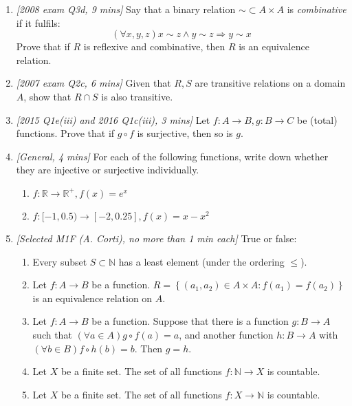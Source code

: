 \documentclass[10pt,a4paper]{article}
\begin{document}
\begin{enumerate}
    \item \emph{[2008 exam Q3d, 9 mins]}
    Say that a binary relation \(\sim \subset A \times A \)  is \emph{combinative} if it fulfils:
    \[ (\forall x, y, z) x \sim z \land y \sim z \Rightarrow y \sim x \]
    Prove that if \(R\) is reflexive and combinative, then \(R\) is an equivalence relation.

    \item \emph{[2007 exam Q2c, 6 mins]}
    Given that \(R, S\) are transitive relations on a domain \(A\), show that \( R \cap S \) is also transitive.

    \item \emph{[2015 Q1e(iii) and 2016 Q1c(iii), 3 mins]}
    Let \(f: A \rightarrow B, g : B \rightarrow C\) be (total) functions.
    Prove that if \(g \circ f\) is surjective, then so is \(g\).

    \item \emph{[General, 4 mins]}
    For each of the following functions, write down whether they are injective or surjective individually.
    \begin{enumerate}
        \item \( f : \mathbb{R} \rightarrow \mathbb{R}^+, f(x) = e^x \)
        \item \( f : [-1, 0.5) \rightarrow [-2, 0.25], f(x) = x - x^2 \)
    \end{enumerate}

    \item \emph{[Selected M1F (A. Corti), no more than 1 min each]}
    True or false:
    \begin{enumerate}
        \item Every subset \(S \subset \mathbb{N} \) has a least element (under the ordering \( \le \)).
        \item Let \(f : A \rightarrow B \) be a function.
        \( R = \left\{ (a_1, a_2) \in A \times A : f(a_1) = f(a_2) \right\} \) 
        is an equivalence relation on \(A\).
        \item Let \( f : A \rightarrow B \) be a function.
        Suppose that there is a function \( g : B \rightarrow A \) such that 
        \( (\forall a \in A) g \circ f (a) = a \), and another function \( h : B \rightarrow A \) with 
        \( (\forall b \in B) f \circ h (b) = b \). Then \(g = h\).
        \item Let \(X\) be a finite set. The set of all functions \( f : \mathbb{N} \rightarrow X \) is countable.
        \item Let \(X\) be a finite set. The set of all functions \( f : X \rightarrow \mathbb{N} \) is countable.
    \end{enumerate}
\end{enumerate}
\end{document}
